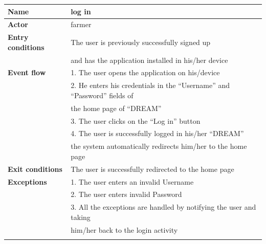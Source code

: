 \begin{table}[H]
\begin{tabular}{|l|l|}
\hline
\normalsize	
\textbf{Name} & log in\\\hline
\textbf{Actor} & farmer\\\hline
\textbf{Entry conditions} & The user is previously successfully signed up 
\\&and has the application installed in his/her device\\\hline
\textbf{Event flow}  &  1. The user opens the application on his/device\\&
2. He enters his credentials in the “Username” and “Password” fields of\\&
the home page of “DREAM”\\&
3. The user clicks on the “Log in” button\\&
4. The user is successfully logged in his/her “DREAM”\\&
the system automatically redirects him/her to the home page\\\hline
\textbf{Exit conditions} & The user is successfully redirected to the home page \\\hline
\textbf{Exceptions }& 
1. The user enters an invalid Username\\&
2. The user enters invalid Password\\&
3. All the exceptions are handled by notifying the user and taking\\&
him/her back to the login activity\\&
\\\hline
\end{tabular}
\end{table}


